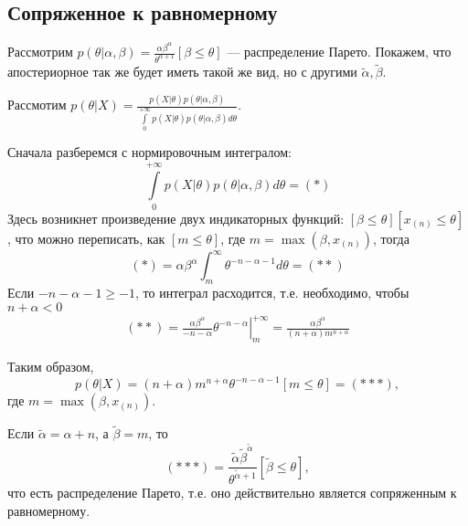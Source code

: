 \subsection{Сопряженное к равномерному}
\begin{solution}
    Рассмотрим $p(\theta | \alpha, \beta) = \frac{\alpha \beta^{\alpha}}{\theta^{\alpha + 1}} [\beta \le \theta]$ --- распределение Парето. Покажем, что апостериорное так же будет иметь такой же вид, но с другими $\tilde{\alpha}, \tilde{\beta}$.

    Рассмотим $p(\theta | X) = \frac{p(X|\theta)p(\theta|\alpha, \beta)}{\int\limits_0^{+\infty} p(X | \theta)p(\theta | \alpha, \beta) d\theta}$.

    Сначала разберемся с нормировочным интегралом:
    \begin{equation}
        \int\limits_0^{+\infty} p(X | \theta)p(\theta | \alpha, \beta) d\theta = (*)
    \end{equation}
    Здесь возникнет произведение двух индикаторных функций: $[\beta \le \theta][x_{(n)} \le \theta]$, что можно переписать, как $[m \le \theta]$, где $m = \max(\beta, x_{(n)})$, тогда
    \begin{equation}
        (*) = \alpha \beta^{\alpha} \int_m^{\infty} \theta^{-n - \alpha - 1}d\theta = (**)
    \end{equation}
    Если $-n - \alpha - 1 \ge -1$, то интеграл расходится, т.е. необходимо, чтобы $n + \alpha < 0$
    \begin{gather}
        (**) = \left.\frac{\alpha \beta^{\alpha}}{-n - \alpha} \theta^{-n -\alpha}\right|_{m}^{+\infty} = \frac{\alpha \beta^{\alpha}}{(n + \alpha)m^{n + \alpha}}
    \end{gather}

    Таким образом,
    \begin{equation}
        p(\theta | X) = (n + \alpha)m^{n + \alpha} \theta^{-n - \alpha - 1}[m \le \theta] = (***),
    \end{equation}
    где $m = \max(\beta, x_{(n)})$.

    Если $\tilde{\alpha} = \alpha + n$, а $\tilde{\beta} = m$, то
    \begin{equation}
        (***) = \frac{\tilde{\alpha}\tilde{\beta}^{\tilde{\alpha}}}{\theta^{\tilde{\alpha} + 1}}[\tilde{\beta} \le \theta],
    \end{equation}
    что есть распределение Парето, т.е. оно действительно является сопряженным к равномерному.
\end{solution}


